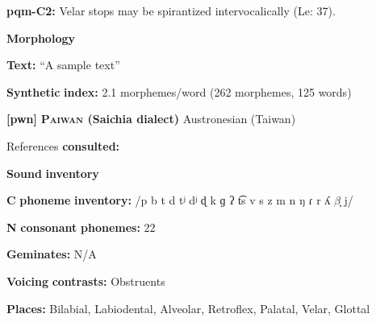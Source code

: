 \begin{styleBody}
\textbf{pqm-C2:} Velar stops may be spirantized intervocalically (Le\citealt{Sourd1993}: 37).
\end{styleBody}

\begin{styleBody}
\textbf{Morphology}
\end{styleBody}

\begin{styleBody}
\textbf{Text:} “A sample text” \citep[55-58]{Leavitt1996}
\end{styleBody}

\begin{styleBody}
\textbf{Synthetic} \textbf{index:} 2.1 morphemes/word (262 morphemes, 125 words)
\end{styleBody}

\begin{styleBody}
\textbf{[pwn]}   \textbf{\textsc{Paiwan} \textbf{(Saichia} \textbf{dialect)}}  Austronesian (Taiwan)
\end{styleBody}

\begin{styleBody}
References \textbf{consulted:} \citet{Chang2006}
\end{styleBody}

\begin{styleBody}
\textbf{Sound} \textbf{inventory}
\end{styleBody}

\begin{styleBody}
\textbf{C} \textbf{phoneme} \textbf{inventory:} /p b t d tʲ dʲ ɖ k ɡ ʔ t͡s v s z m n ŋ ɾ r ʎ $\beta ̞$ j/
\end{styleBody}

\begin{styleBody}
\textbf{N} \textbf{consonant} \textbf{phonemes:} 22
\end{styleBody}

\begin{styleBody}
\textbf{Geminates:} N/A
\end{styleBody}

\begin{styleBody}
\textbf{Voicing} \textbf{contrasts:} Obstruents
\end{styleBody}

\begin{styleBody}
\textbf{Places:} Bilabial, Labiodental, Alveolar, Retroflex, Palatal, Velar, Glottal
\end{styleBody}

